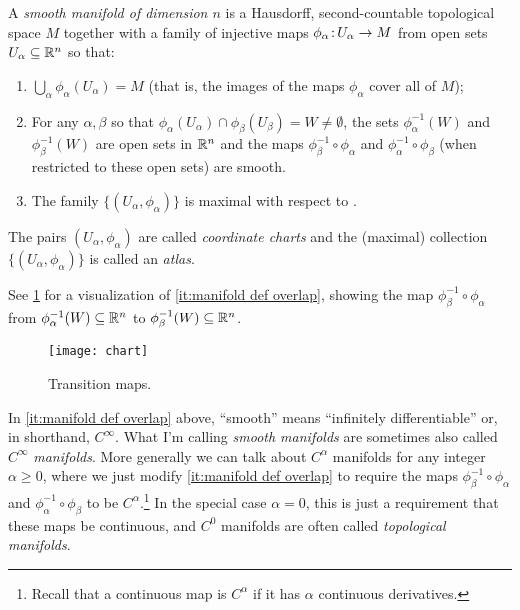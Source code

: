 \begin{definition}\label{def:manifold}
	A \emph{smooth manifold of dimension $n$} is a Hausdorff, second-countable topological space $M$ together with a family of injective maps $\phi_\alpha\colon\thinspace\!\! U_\alpha \to M$ from open sets $U_\alpha \subseteq \mathbb{R}^n$ so that:
	\begin{enumerate}
		\item \label{it:manifold def cover}$\bigcup_\alpha \phi_\alpha(U_\alpha) = M$ (that is, the images of the maps $\phi_\alpha$ cover all of $M$);
		\item \label{it:manifold def overlap}For any $\alpha, \beta$ so that $\phi_\alpha(U_\alpha) \cap \phi_\beta(U_\beta) = W \neq \emptyset$, the sets $\phi_\alpha^{-1}(W)$ and $\phi_\beta^{-1}(W)$ are open sets in $\mathbb{R}^n$ and the maps $\phi_\beta^{-1} \circ \phi_\alpha$ and $\phi_\alpha^{-1} \circ \phi_\beta$ (when restricted to these open sets) are smooth.
		\item \label{it:manifold def maximal}The family $\{(U_\alpha, \phi_\alpha)\}$ is maximal with respect to .
	\end{enumerate}
	The pairs $(U_\alpha, \phi_\alpha)$ are called \emph{coordinate charts} and the (maximal) collection $\{(U_\alpha, \phi_\alpha)\}$ is called an \emph{atlas}.	
\end{definition}

See \cref{fig:chart} for a visualization of \ref{it:manifold def overlap}, showing the map $\phi_\beta^{-1} \circ \phi_\alpha$ from $\phi_\alpha^{-1}(W) \subseteq \mathbb{R}^n$ to $\phi_\beta^{-1}(W) \subseteq \mathbb{R}^n$.

\begin{figure}[htbp]
	\centering
		\texttt{[image: chart]}
	\caption{Transition maps.}
	\label{fig:chart}
\end{figure}

\begin{remark}
	In \ref{it:manifold def overlap} above, ``smooth'' means ``infinitely differentiable'' or, in shorthand, $C^\infty$. What I'm calling \emph{smooth manifolds} are sometimes also called $C^\infty$ \emph{manifolds}. More generally we can talk about $C^\alpha$ manifolds for any integer $\alpha \geq 0$, where we just modify \ref{it:manifold def overlap} to require the maps $\phi_\beta^{-1} \circ \phi_\alpha$ and $\phi_\alpha^{-1} \circ \phi_\beta$ to be $C^\alpha$.\footnote{Recall that a continuous map is $C^\alpha$ if it has $\alpha$ continuous derivatives.} In the special case $\alpha = 0$, this is just a requirement that these maps be continuous, and $C^0$ manifolds are often called \emph{topological manifolds}.
\end{remark}

